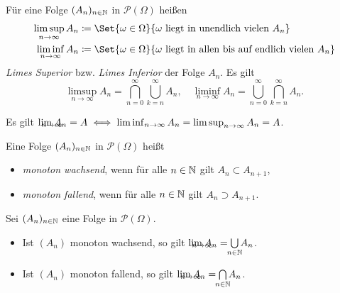 \documentclass{cheat-sheet}
\newcommand{\PS}{\mathcal{P}} %
\newcommand{\PSO}{\PS(\Omega)} %
\begin{document}
\begin{defn}
  Für eine Folge $(A_n)_{n \in \mathbb{N}}$ in $\PS(\Omega)$ heißen
  \begin{align*}
    \limsup_{n \to \infty} A_n &\coloneqq \Set{ \omega \in \Omega }{ \omega \text{ liegt in unendlich vielen } A_n } \\
    \liminf_{n \to \infty} A_n &\coloneqq \Set{ \omega \in \Omega }{ \omega \text{ liegt in allen bis auf endlich vielen } A_n }
  \end{align*}
  \emph{Limes Superior} bzw. \emph{Limes Inferior} der Folge $A_n$. Es gilt
  \[
    \limsup_{n \to \infty} A_n = \bigcap_{n = 0}^\infty \bigcup_{k = n}^\infty A_n, \quad
    \liminf_{n \to \infty} A_n = \bigcup_{n = 0}^\infty \bigcap_{k = n}^\infty A_n.
  \]
\end{defn}


\begin{satz}
  Es gilt $\lim_{\mathclap{n \to \infty}} A_n = A \iff \liminf_{n \to \infty} A_n = \limsup_{n \to \infty} A_n = A$.
\end{satz}

\begin{defn}
  Eine Folge $(A_n)_{n \in \mathbb{N}}$ in $\PSO$ heißt
  \begin{itemize}
    \item \emph{monoton wachsend}, wenn für alle $n \in \mathbb{N}$ gilt $A_n \subset A_{n+1}$,
    \item \emph{monoton fallend}, wenn für alle $n \in \mathbb{N}$ gilt $A_n \supset A_{n+1}$.
  \end{itemize}
\end{defn}

\begin{satz}
  Sei $(A_n)_{n \in \mathbb{N}}$ eine Folge in $\PSO$.
  \begin{itemize}
    \item Ist $(A_n)$ monoton wachsend, so gilt $\lim_{\mathclap{n \to \infty}} A_n = \bigcup_{\mathclap{n \in \N}} A_n$.
    \item Ist $(A_n)$ monoton fallend, so gilt $\lim_{\mathclap{n \to \infty}} A_n = \bigcap_{\mathclap{n \in \N}} A_n$.
  \end{itemize}
\end{satz}
\end{document}
